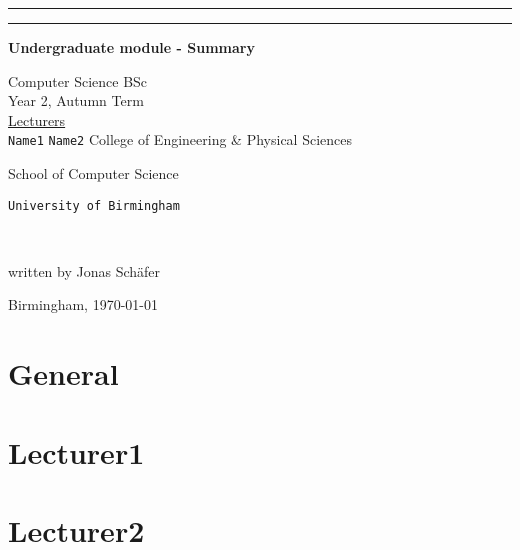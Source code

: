 \documentclass[a4paper,10pt]{article} %
\begin{document}
\thispagestyle{empty}
\begin{center}
    \rule{\textwidth}{1mm}\vspace{7mm}
    \huge{}\par
    \vspace{5mm}
    \rule{\textwidth}{1mm}\par
    \vspace{13mm}

    \Large{\textbf{Undergraduate module - Summary}}\par
    \vspace{5mm}
    \large
    Computer Science BSc \\
    \vspace{1mm}
    Year 2, Autumn Term \\
    \vspace{8mm}
    \Large{\underline{Lecturers}} \\
    \large
    \texttt{Name1}
    \texttt{Name2}
    \vspace{10mm}
    College of Engineering \& Physical Sciences\par
    \vspace{3mm}
    School of Computer Science


    \vspace{15mm}

    \Large{\texttt{University of Birmingham}}\par
    \ \\
    \normalsize \par

    written by Jonas Schäfer\par
    \vspace{2mm}

    Birmingham, \today\par
\end{center}

\newpage
\tableofcontents

\newpage
\section{General}

\newpage
\section{Lecturer1}

\newpage
\section{Lecturer2}
\end{document}
